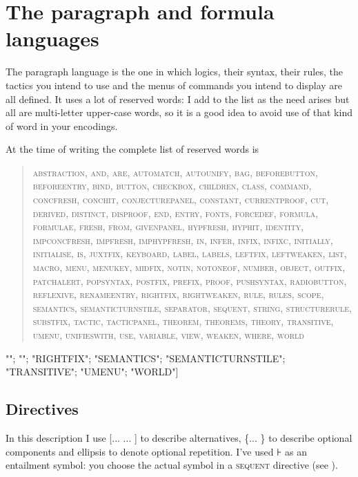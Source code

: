 \chapter{The paragraph and formula languages}
\label{appx:paraformlang}


The paragraph language is the one in which logics, their syntax, their rules, the tactics you intend to use and the menus of commands you intend to display are all defined. It uses a lot of reserved words: I add to the list as the need arises but all are multi-letter upper-case words, so it is a good idea to avoid use of that kind of word in your encodings.

At the time of writing the complete list of reserved words is
\begin{quote}
\textsc{abstraction, and, are, automatch, autounify, bag, beforebutton, beforeentry, bind, button, checkbox, children, class, command, concfresh, conchit, conjecturepanel, constant, currentproof, cut, derived, distinct, disproof, end, entry, fonts, forcedef, formula, formulae, fresh, from, givenpanel, hypfresh, hyphit, identity, impconcfresh, impfresh, imphypfresh, in, infer, infix, infixc, initially, initialise, is, juxtfix, keyboard, label, labels, leftfix, leftweaken, list, macro, menu, menukey, midfix, notin, notoneof, number, object, outfix, patchalert, popsyntax, postfix, prefix, proof, pushsyntax, radiobutton, reflexive, renameentry, rightfix, rightweaken, rule, rules, scope, semantics, semanticturnstile, separator, sequent, string, structurerule, substfix, tactic, tacticpanel, theorem, theorems, theory, transitive, umenu, unifieswith, use, variable, view, weaken, where, world}
\end{quote}

 
       
     ""; ""; "RIGHTFIX";  
     "SEMANTICS"; "SEMANTICTURNSTILE"; "TRANSITIVE"; 
     "UMENU"; "WORLD"]

\section{Directives}

In this description I use [... {\textbar}... ] to describe alternatives, \{... \} to describe optional components and ellipsis to denote optional repetition. I've used ⊦ as an entailment symbol: you choose the actual symbol in a \textsc{sequent} directive (see ).

